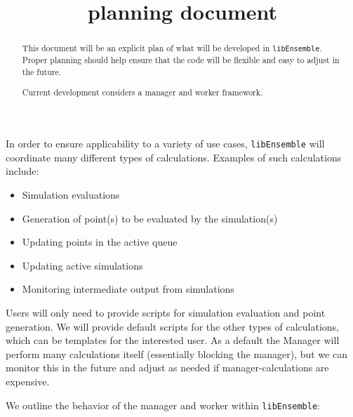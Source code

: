 \documentclass{article}
\title{\libE planning document}
\newcommand{\libE}{\texttt{libEnsemble}\xspace}
\begin{document}
\maketitle
\begin{abstract}
  This document will be an explicit plan of what will be developed in
  \libE. Proper planning should help ensure that the code will be flexible
  and easy to adjust in the future.

  Current development considers a manager and worker framework.
\end{abstract}

In order to ensure applicability to a variety of use cases,
\libE will coordinate many different types of calculations. Examples of
such calculations include:
\begin{itemize}
  \item Simulation evaluations
  \item Generation of point(s) to be evaluated by the simulation(s)
  \item Updating points in the active queue
  \item Updating active simulations
  \item Monitoring intermediate output from simulations
\end{itemize}
Users will only need to provide scripts for simulation evaluation and point
generation. We will provide default scripts for the other types of calculations,
which can be templates for the interested user. As a default the Manager will
perform many calculations itself (essentially blocking the manager), but we can
monitor this in the future and adjust as needed if manager-calculations are
expensive.

We outline the behavior of the manager and worker within \libE:
\end{document}

